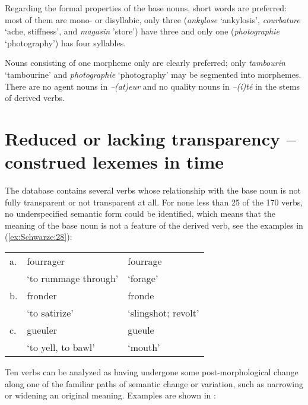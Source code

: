 \documentclass[output=paper]{langsci/langscibook}
\begin{document}
Regarding the formal properties of the base nouns, short words are preferred: most of them are mono- or disyllabic, only three
(\emph{ankylose} `ankylosis', \emph{courbature} `ache, stiffness', and
\emph{magasin} 'store') have three and only one (\emph{photographie}
`photography') has four syllables.

Nouns consisting of one morpheme only are clearly preferred; only
\emph{tambourin} `tambourine' and \emph{photographie} `photography' may be segmented into morphemes. There are no agent nouns in
\emph{--(at)eur} and no quality nouns in \emph{--(i)té} in the stems of derived verbs.

\section{Reduced or lacking transparency -- construed lexemes in time}\label{reduced-or-lacking-transparency-construed-lexemes-in-time}

The database contains several verbs whose relationship with the base noun is not fully transparent or not transparent at all. For none less than 25 of the 170 verbs, no underspecified semantic form could be identified, which means that the meaning of the base noun is not a feature of the derived verb, see the examples in (\ref{ex:Schwarze:28}):

\ea \label{ex:Schwarze:28}
\begin{tabular}[t]{@{}lll}
a. & fourrager & fourrage\\
   &`to rummage through' & `forage'\\
b. & fronder &fronde \\
   & `to satirize' & `slingshot; revolt' \\
c. & gueuler &   gueule \\
   & `to yell, to bawl' & `mouth' \\
\end{tabular}
\z

Ten verbs can be analyzed as having undergone some post-morphological change along one of the familiar paths of semantic change or variation,
such as narrowing or widening an original meaning. Examples are shown in :
\end{document}
